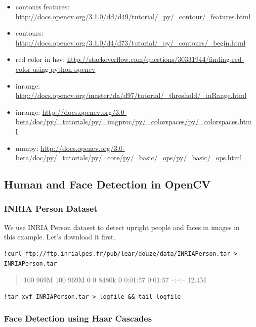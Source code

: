 \begin{itemize}

\item
  contours features:
  \url{http://docs.opencv.org/3.1.0/dd/d49/tutorial/_py/_contour/_features.html}
\item
  contours:
  \url{http://docs.opencv.org/3.1.0/d4/d73/tutorial/_py/_contours/_begin.html}
\item
  red color in hsv:
  \url{http://stackoverflow.com/questions/30331944/finding-red-color-using-python-opencv}
\item
  inrange:
  \url{http://docs.opencv.org/master/da/d97/tutorial/_threshold/_inRange.html}
\item
  inrange:
  \url{http://docs.opencv.org/3.0-beta/doc/py/_tutorials/py/_imgproc/py/_colorspaces/py/_colorspaces.html}
\item
  numpy:
  \url{http://docs.opencv.org/3.0-beta/doc/py/_tutorials/py/_core/py/_basic/_ops/py/_basic/_ops.html}
\end{itemize}

\subsection{Human and Face Detection in
OpenCV}\label{human-and-face-detection-in-opencv}

\subsubsection{INRIA Person Dataset}\label{inria-person-dataset-1}

We use INRIA Person dataset to detect upright people and faces in images
in this example. Let's download it first.

\begin{lstlisting}
!curl ftp://ftp.inrialpes.fr/pub/lear/douze/data/INRIAPerson.tar > INRIAPerson.tar
\end{lstlisting}

\begin{quote}
100 969M 100 969M 0 0 8480k 0 0:01:57 0:01:57 --:--:-- 12.4M
\end{quote}

\begin{lstlisting}
!tar xvf INRIAPerson.tar > logfile && tail logfile
\end{lstlisting}

\subsubsection{Face Detection using Haar
Cascades}\label{face-detection-using-haar-cascades}

